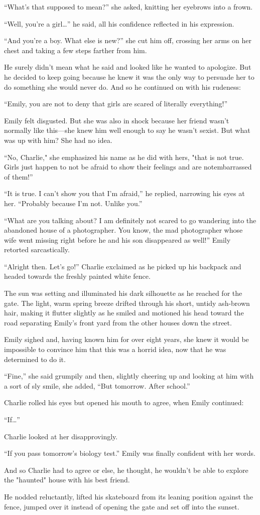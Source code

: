 “What’s that supposed to mean?” she asked, knitting her eyebrows into a frown.

“Well, you’re a girl…” he said, all his confidence reflected in his expression.

“And you’re a boy. What else is new?” she cut him off, crossing her arms on her chest and taking a few steps farther from him.

He surely didn’t mean what he said and looked like he wanted to apologize. But he decided to keep going because he knew it was the only way to persuade her to do something she would never do. And so he continued on with his rudeness:

“Emily, you are not to deny that girls are scared of literally everything!”

Emily felt disgusted. But she was also in shock because her friend wasn’t normally like this—she knew him well enough to say he wasn’t sexist. But what was up with him? She had no idea.

“No, Charlie," she emphasized his name as he did with hers, "that is not true. Girls just happen to not be afraid to show their feelings and are notembarrassed of them!”

“It is true. I can’t show you that I’m afraid,” he replied, narrowing his eyes at her. “Probably because I’m not. Unlike you.”

“What are you talking about? I am definitely not scared to go wandering into the abandoned house of a photographer. You know, the mad photographer whose wife went missing right before he and his son disappeared as well!” Emily retorted sarcastically.

“Alright then. Let’s go!” Charlie exclaimed as he picked up his backpack and headed towards the freshly painted white fence.

The sun was setting and illuminated his dark silhouette as he reached for the gate. The light, warm spring breeze drifted    through his short, untidy ash-brown hair, making it flutter slightly as he smiled and motioned his head toward the road separating Emily’s front yard from the other houses down the street.

Emily sighed and, having known him for over eight years, she knew it would be impossible to convince him that this was a horrid idea, now that he was determined to do it.

“Fine,” she said grumpily and then, slightly cheering up and looking at him with a sort of sly smile, she added, “But tomorrow. After school.”

Charlie rolled his eyes but opened his mouth to agree, when Emily continued:

“If…”

Charlie looked at her disapprovingly.

“If you pass tomorrow’s biology test.” Emily was finally confident with her words.

And so Charlie had to agree or else, he thought, he wouldn’t be able to explore the "haunted" house with his best friend.

He nodded reluctantly, lifted his skateboard from its leaning position against the fence, jumped over it instead of opening the gate and set off into the sunset.